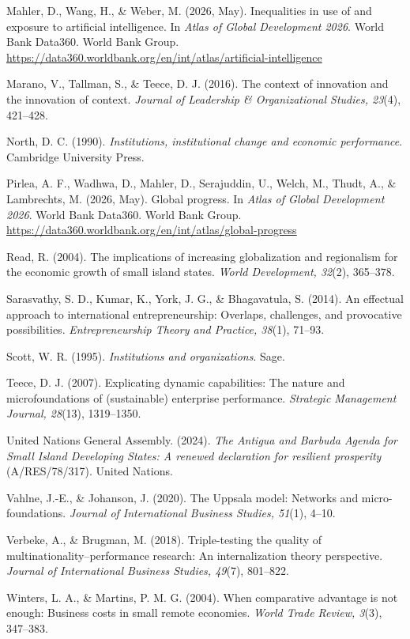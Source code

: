 \documentclass[12pt,a4paper]{article}
\begin{document}
Mahler, D., Wang, H., \& Weber, M. (2026, May). Inequalities in use of
and exposure to artificial intelligence. In \emph{Atlas of Global
Development 2026}. World Bank Data360. World Bank Group.
\url{https://data360.worldbank.org/en/int/atlas/artificial-intelligence}

Marano, V., Tallman, S., \& Teece, D. J. (2016). The context of
innovation and the innovation of context. \emph{Journal of Leadership \&
Organizational Studies, 23}(4), 421--428.

North, D. C. (1990). \emph{Institutions, institutional change and
economic performance}. Cambridge University Press.

Pirlea, A. F., Wadhwa, D., Mahler, D., Serajuddin, U., Welch, M., Thudt,
A., \& Lambrechts, M. (2026, May). Global progress. In \emph{Atlas of
Global Development 2026}. World Bank Data360. World Bank Group.
\url{https://data360.worldbank.org/en/int/atlas/global-progress}

Read, R. (2004). The implications of increasing globalization and
regionalism for the economic growth of small island states. \emph{World
Development, 32}(2), 365--378.

Sarasvathy, S. D., Kumar, K., York, J. G., \& Bhagavatula, S. (2014). An
effectual approach to international entrepreneurship: Overlaps,
challenges, and provocative possibilities. \emph{Entrepreneurship Theory
and Practice, 38}(1), 71--93.

Scott, W. R. (1995). \emph{Institutions and organizations}. Sage.

Teece, D. J. (2007). Explicating dynamic capabilities: The nature and
microfoundations of (sustainable) enterprise performance.
\emph{Strategic Management Journal, 28}(13), 1319--1350.

United Nations General Assembly. (2024). \emph{The Antigua and Barbuda
Agenda for Small Island Developing States: A renewed declaration for
resilient prosperity} (A/RES/78/317). United Nations.

Vahlne, J.-E., \& Johanson, J. (2020). The Uppsala model: Networks and
micro-foundations. \emph{Journal of International Business Studies,
51}(1), 4--10.

Verbeke, A., \& Brugman, M. (2018). Triple-testing the quality of
multinationality--performance research: An internalization theory
perspective. \emph{Journal of International Business Studies, 49}(7),
801--822.

Winters, L. A., \& Martins, P. M. G. (2004). When comparative advantage
is not enough: Business costs in small remote economies. \emph{World
Trade Review, 3}(3), 347--383.
\end{document}
